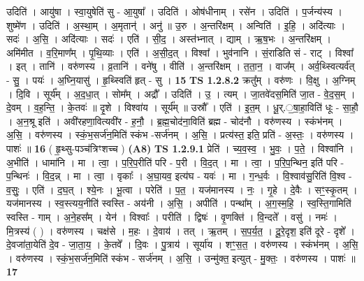 \documentclass[17pt]{extarticle}
\begin{document}
                  उदिति॑ । आयु॑षा । स्वा॒युषेति॑ सु - आ॒युषा᳚ । उदिति॑ । ओष॑धीनाम् । रसे॑न । उदिति॑ । प॒र्जन्य॑स्य । शुष्मे॑ण । उदिति॑ । अ॒स्था॒म् । अ॒मृतान्॑ । अनु॑ ॥ उ॒रु । अ॒न्तरि॑क्षम् । अन्विति॑ । इ॒हि॒ । अदि॑त्याः । सदः॑ । अ॒सि॒ । अदि॑त्याः । सदः॑ । एति॑ । सी॒द॒ । अस्त॑भ्नात् । द्याम् । ऋ॒ष॒भः । अ॒न्तरि॑क्षम् । अमि॑मीत । व॒रि॒माण᳚म् । पृ॒थि॒व्याः । एति॑ । अ॒सी॒द॒त् । विश्वा᳚ । भुव॑नानि । सं॒राडिति सं - राट् । विश्वा᳚ । इत् । तानि॑ । वरु॑णस्य । व्र॒तानि॑ । वने॑षु । वीति॑ । अ॒न्तरि॑क्षम् । त॒ता॒न॒ । वाज᳚म् । अर्व॒थ्स्वित्यर्व॑त् - सु॒ । पयः॑ । अ॒घ्नि॒यासु॑ । हृ॒थ्स्विति॑ हृत् - सु । \textbf{  15} \newline
                  \newline
                                \textbf{ TS 1.2.8.2} \newline
                  क्रतु᳚म् । वरु॑णः । वि॒क्षु । अ॒ग्निम् । दि॒वि । सूर्य᳚म् । अ॒द॒धा॒त् । सोम᳚म् । अद्रौ᳚ । उदिति॑ । उ॒ । त्यम् । जा॒तवे॑दस॒मिति॑ जा॒त - वे॒द॒स॒म् । दे॒वम् । व॒ह॒न्ति॒ । के॒तवः॑ ॥ दृ॒शे । विश्वा॑य । सूर्य᳚म् ॥ उस्रौ᳚ । एति॑ । इ॒त॒म् । धू॒र्.॒षा॒हा॒विति॑ धूः - सा॒हौ॒ । अ॒न॒श्रू इति॑ । अवी॑रहणा॒वित्यवी॑र - ह॒नौ॒ । ब्र॒ह्म॒चोद॑ना॒विति॑ ब्रह्म - चोद॑नौ । वरु॑णस्य । स्कंभ॑नम् । अ॒सि॒ । वरु॑णस्य । स्कं॒भ॒सर्ज॑न॒मिति॑ स्कंभ -सर्ज॑नम् । अ॒सि॒ । प्रत्य॑स्त॒ इति॒ प्रति॑ - अ॒स्तः॒ । वरु॑णस्य । पाशः॑ ॥ \textbf{  16 } \newline
                  \newline
                      ( हृ॒थ्सु-पञ्च॑त्रिꣳशच्च )  \textbf{(A8)} \newline \newline
                                \textbf{ TS 1.2.9.1} \newline
                  प्रेति॑ । च्य॒व॒स्व॒ । भु॒वः॒ । प॒ते॒ । विश्वा॑नि । अ॒भीति॑ । धामा॑नि । मा । त्वा॒ । प॒रि॒प॒रीति॑ परि - प॒री । वि॒द॒त् । मा । त्वा॒ । प॒रि॒प॒न्थिन॒ इति॑ परि - प॒न्थिनः॑ । वि॒द॒न्न् । मा । त्वा॒ । वृकाः᳚ । अ॒घा॒यव॒ इत्य॑घ - यवः॑ । मा । ग॒न्ध॒र्वः । वि॒श्वाव॑सु॒रिति॑ वि॒श्व - व॒सुः॒ । एति॑ । द॒घ॒त् । श्ये॒नः । भू॒त्वा । परेति॑ । प॒त॒ । यज॑मानस्य । नः॒ । गृ॒हे । दे॒वैः । सꣳ॒॒स्कृ॒तम् । यज॑मानस्य । स्व॒स्त्यय॒नीति॑ स्वस्ति - अय॑नी । अ॒सि॒ । अपीति॑ । पन्था᳚म् । अ॒ग॒स्म॒हि॒ । स्व॒स्ति॒गामिति॑ स्वस्ति - गाम् । अ॒ने॒हस᳚म् । येन॑ । विश्वाः᳚ । परीति॑ । द्विषः॑ । वृ॒णक्ति॑ । वि॒न्दते᳚ । वसु॑ । नमः॑ । मि॒त्रस्य॑ ( ) । वरु॑णस्य । चक्ष॑से । म॒हः । दे॒वाय॑ । तत् । ऋ॒तम् । स॒प॒र्य॒त॒ । दू॒रे॒दृश॒ इति॑ दूरे - दृशे᳚ । दे॒वजा॑ता॒येति॑ दे॒व - जा॒ता॒य॒ । के॒तवे᳚ । दि॒वः । पु॒त्राय॑ । सूर्या॑य । शꣳ॒॒स॒त॒ । वरु॑णस्य । स्कंभ॑नम् । अ॒सि॒ । वरु॑णस्य । स्कं॒भ॒सर्ज॑न॒मिति॑ स्कंभ - सर्ज॑नम् । अ॒सि॒ । उन्मु॑क्त॒ इत्युत् - मु॒क्तः॒ । वरु॑णस्य । पाशः॑ ॥ \textbf{  17 } \newline
\end{document}
